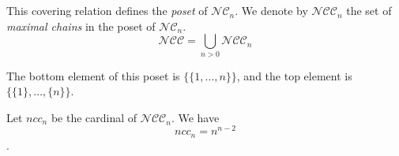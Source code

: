 \begin{prop}
    This covering relation defines the \emph{poset}
    of $\mathcal{NC}_n$.
    We denote by $\mathcal{NCC}_n$ the set of
    \emph{maximal chains} in the poset of $\mathcal{NC}_n$.\\
    $$\mathcal{NCC} = \bigcup_{n > 0}{\mathcal{NCC}_n}$$
\end{prop}

\begin{rem}
    The bottom element of this poset is $\{\{1, \ldots, n\}\}$,
    and the top element is $\{\{1\}, \ldots, \{n\}\}$.
\end{rem}

\begin{theorem}
    Let $ncc_n$ be the cardinal of $\mathcal{NCC}_n$.
    We have $$ncc_n = n^{n - 2}$$.
\end{theorem}

